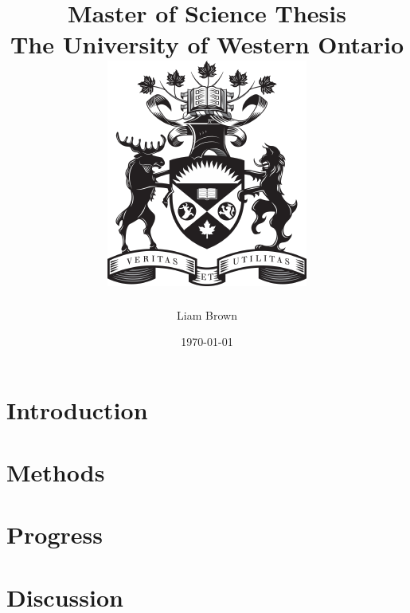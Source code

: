 \documentclass[12pt, twoside]{report}
\title{
        {Master of Science Thesis}\\
        {\large The University of Western Ontario}\\[1cm]
        {\includegraphics{figures/uwo_coatofarms.pdf}}
    }
\author{Liam Brown}
\date{\today}
\begin{document}
\maketitle

\tableofcontents

\chapter{Introduction}
    

\chapter{Methods}
    

\chapter{Progress}
    

\chapter{Discussion}
    

\printbibliography
\end{document}
